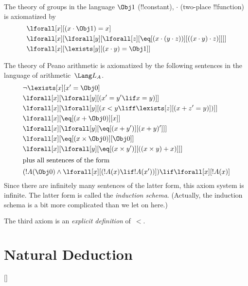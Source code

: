 \begin{ex}
The theory of groups in the language $\Obj 1$ (!!{constant}), $\cdot$
(two-place !!{function}) is axiomatized by
\begin{align*}
& \lforall[x][(x \cdot \Obj 1) = x]\\
& \lforall[x][\lforall[y][\lforall[z][\eq[(x \cdot (y \cdot z))][((x
          \cdot y) \cdot z)]]]]\\
& \lforall[x][\lexists[y][(x \cdot y) = \Obj 1]]
\end{align*}
\end{ex}

\begin{ex}
The theory of Peano arithmetic is axiomatized by the following
sentences in the language of arithmetic~$\Lang L_A$.
\begin{align*}
& \lnot\lexists[x][x' = \Obj 0]\\
& \lforall[x][\lforall[y][(x' = y' \lif x = y)]]\\
& \lforall[x][\lforall[y][(x < y \liff \lexists[z][(x + z' = y)])]]\\
& \lforall[x][\eq[(x + \Obj 0)][x]]\\
& \lforall[x][\lforall[y][\eq[(x + y')][(x + y)']]]\\
& \lforall[x][\eq[(x \times \Obj 0)][\Obj 0]]\\
& \lforall[x][\lforall[y][\eq[(x \times y')][((x \times y) + x)]]]\\
\intertext{plus all sentences of the form}
& (!A(\Obj 0) \land \lforall[x][(!A(x) \lif !A(x'))]) \lif \lforall[x][!A(x)]
\end{align*}
Since there are infinitely many sentences of the latter form, this
axiom system is infinite.  The latter form is called the
\emph{induction schema}. (Actually, the induction schema is a bit more
complicated than we let on here.)

The third axiom is an \emph{explicit definition} of~$<$.
\end{ex}

\OLEndChapterHook

\chapter{Natural Deduction}

[\nosection]


